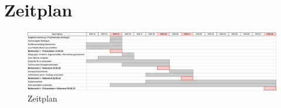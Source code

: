 \section*{Zeitplan}

\begin{figure}[!h]
    \centering
    \includegraphics[width=1\textwidth]{Zeitplan_DeskPlanner.png}
    \caption{Zeitplan}
    \label{fig:Zeitplan}
\end{figure}
